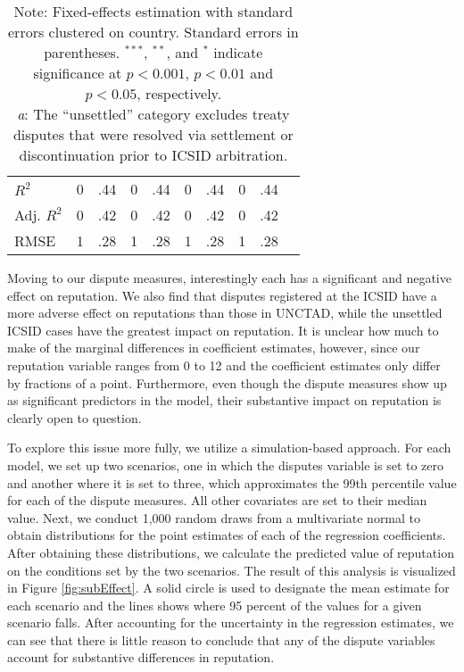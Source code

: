 \documentclass[12pt,onesided]{amsart}
\begin{document}
\begin{savenotes}
\begin{table}[ht]
\begin{tabular}{lr@{} lr@{}lr@{}lr@{}lr@{}}
  $R^{2}$ & 0&.44 & 0&.44 & 0&.44 & 0&.44 \\ 
  Adj. $R^{2}$ & 0&.42 & 0&.42 & 0&.42 & 0&.42 \\ 
  RMSE & 1&.28 & 1&.28 & 1&.28 & 1&.28 \\ 
   \hline\hline
\end{tabular}
\caption*{Note: Fixed-effects estimation with standard errors clustered on country. Standard errors in parentheses. $^{***}$, $^{**}$, and $^{*}$ indicate significance at $p<0.001$, $p<0.01$ and $p<0.05$, respectively. \\ \textit{a}: The ``unsettled'' category excludes treaty disputes that were resolved via settlement or discontinuation prior to ICSID arbitration.}
\end{table}
\end{savenotes}


Moving to our dispute measures, interestingly each has a significant and negative effect on reputation. We also find that disputes registered at the ICSID have a more adverse effect on reputations than those in UNCTAD, while the unsettled ICSID cases have the greatest impact on reputation. It is unclear how much to make of the marginal differences in coefficient estimates, however, since our reputation variable ranges from 0 to 12 and the coefficient estimates only differ by fractions of a point. Furthermore, even though the dispute measures show up as significant predictors in the model, their substantive impact on reputation is clearly open to question. 

To explore this issue more fully, we utilize a simulation-based approach. For each model, we set up two scenarios, one in which the disputes variable is set to zero and another where it is set to three, which approximates the 99th percentile value for each of the dispute measures. All other covariates are set to their median value. Next, we conduct 1,000 random draws from a multivariate normal to obtain distributions for the point estimates of each of the regression coefficients. After obtaining these distributions, we calculate the predicted value of reputation on the conditions set by the two scenarios. The result of this analysis is visualized in Figure \ref{fig:subEffect}. A solid circle is used to designate the mean estimate for each scenario and the lines shows where 95 percent of the values for a given scenario falls. After accounting for the uncertainty in the regression estimates, we can see that there is little reason to conclude that any of the dispute variables account for substantive differences in reputation.
\end{document}
